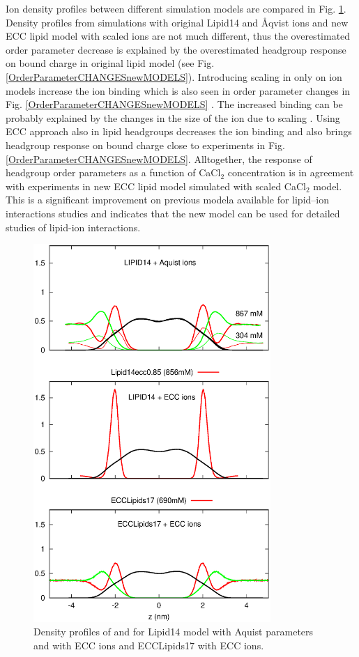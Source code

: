 \documentclass[aip,jcp,twocolumn]{revtex4}
\begin{document}
Ion density profiles between different simulation models are compared in Fig. \ref{fig:cacl-dens}.
Density profiles from simulations with original Lipid14 and Åqvist ions and new ECC lipid model with
scaled ions are not much different, thus the overestimated order parameter decrease is explained
by the overestimated headgroup response on bound charge in original lipid model (see Fig. \ref{OrderParameterCHANGESnewMODELS}). 
Introducing scaling in only on ion models increase the ion binding which is also seen in order parameter
changes in Fig. \ref{OrderParameterCHANGESnewMODELS} .
The increased binding can be probably explained by the changes in the size of the ion due to scaling .
Using ECC approach also in lipid headgroups decreases the ion binding and also brings headgroup response
on bound charge close to experiments in Fig. \ref{OrderParameterCHANGESnewMODELS}. Alltogether,
the response of headgroup order parameters as a function of CaCl$_2$ concentration is in agreement with
experiments in new ECC lipid model simulated with scaled CaCl$_2$ model. This is a significant improvement
on previous modela available for lipid--ion interactions studies \cite{catte16} and indicates that
the new model can be used for detailed studies of lipid-ion interactions.


\begin{figure}[]
  \centering
  \includegraphics[width=9.0cm,angle=0]{../Fig/CAdensities.eps}
  \caption{\label{fig:cacl-dens}
    Density profiles of  and  for Lipid14 model with Aquist parameters and with ECC ions and ECCLipids17 with ECC ions. }
\end{figure}
\end{document}
